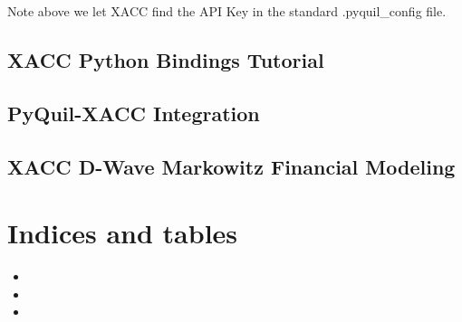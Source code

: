 \documentclass[letterpaper,10pt,english]{sphinxmanual}
\begin{document}
Note above we let XACC find the API Key in the standard .pyquil\_config file.


\section{XACC Python Bindings Tutorial}
\label{\detokenize{tutorials:xacc-python-bindings-tutorial}}

\section{PyQuil-XACC Integration}
\label{\detokenize{tutorials:pyquil-xacc-integration}}

\section{XACC D-Wave Markowitz Financial Modeling}
\label{\detokenize{tutorials:xacc-d-wave-markowitz-financial-modeling}}

\chapter{Indices and tables}
\label{\detokenize{index:indices-and-tables}}\begin{itemize}
\item {} 

\item {} 

\item {} 

\end{itemize}



\renewcommand{\indexname}{Index}
\printindex
\end{document}
